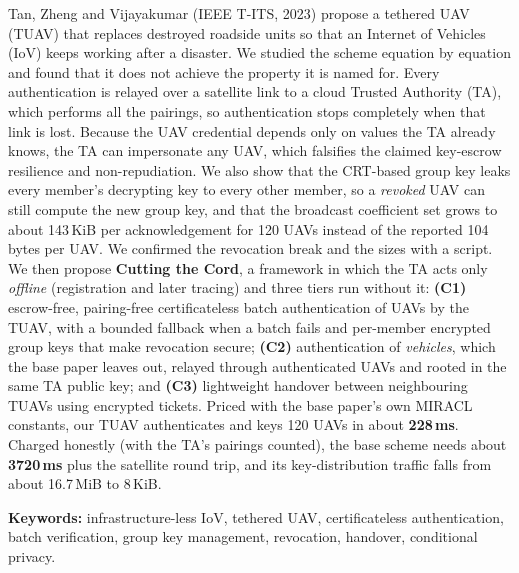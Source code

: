 \documentclass[11pt,a4paper]{article}
\theoremstyle{plain}
\theoremstyle{definition}
\begin{document}
\begin{titlepage}
\vspace{0.6cm}
\begin{tcolorbox}[enhanced,colback=soft,colframe=deep,boxrule=0.5pt,arc=2mm,title={\sffamily\bfseries Abstract},fonttitle=\sffamily\bfseries]
\small
Tan, Zheng and Vijayakumar (IEEE T-ITS, 2023) propose a tethered UAV (TUAV) that replaces destroyed roadside units so that an
Internet of Vehicles (IoV) keeps working after a disaster. We studied the scheme equation by equation and found that it does not
achieve the property it is named for. Every authentication is relayed over a satellite link to a cloud Trusted Authority (TA), which
performs all the pairings, so authentication stops completely when that link is lost. Because the UAV credential depends only on
values the TA already knows, the TA can impersonate any UAV, which falsifies the claimed key-escrow resilience and non-repudiation.
We also show that the CRT-based group key leaks every member's decrypting key to every other member, so a \emph{revoked} UAV can still
compute the new group key, and that the broadcast coefficient set grows to about 143\,KiB per acknowledgement for 120 UAVs instead of
the reported 104 bytes per UAV. We confirmed the revocation break and the sizes with a script.
We then propose \textbf{Cutting the Cord}, a framework in which the TA acts only \emph{offline} (registration and later tracing) and
three tiers run without it: \textbf{(C1)} escrow-free, pairing-free certificateless batch authentication of UAVs by the TUAV, with a
bounded fallback when a batch fails and per-member encrypted group keys that make revocation secure; \textbf{(C2)} authentication of
\emph{vehicles}, which the base paper leaves out, relayed through authenticated UAVs and rooted in the same TA public key; and
\textbf{(C3)} lightweight handover between neighbouring TUAVs using encrypted tickets.
Priced with the base paper's own MIRACL constants, our TUAV authenticates and keys 120 UAVs in about \textbf{228\,ms}. Charged
honestly (with the TA's pairings counted), the base scheme needs about \textbf{3720\,ms} plus the satellite round trip, and its
key-distribution traffic falls from about 16.7\,MiB to 8\,KiB.
\end{tcolorbox}

\vspace{0.3cm}
{\small\sffamily\textbf{Keywords:} infrastructure-less IoV, tethered UAV, certificateless authentication, batch verification, group key management, revocation, handover, conditional privacy.}
\end{titlepage}
\end{document}
